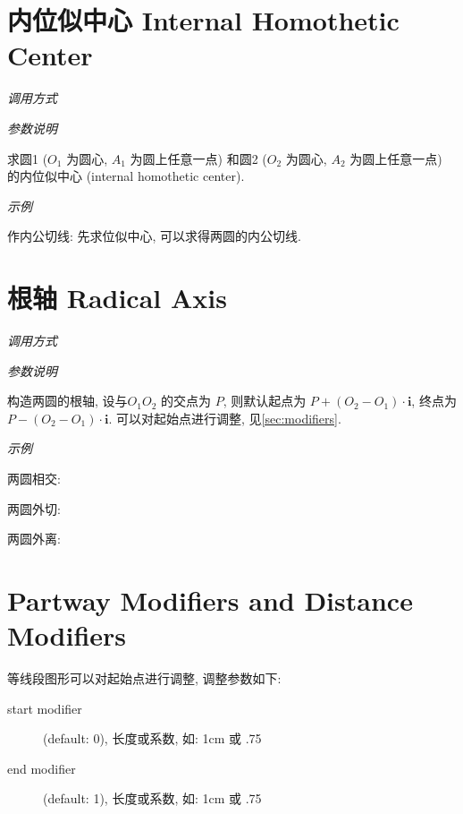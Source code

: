 \section{内位似中心 Internal Homothetic Center}

\emph{调用方式}

\begin{tcolorbox}{}
\end{tcolorbox}

\emph{参数说明}

求圆1 ($O_1$ 为圆心, $A_1$ 为圆上任意一点)
和圆2 ($O_2$ 为圆心, $A_2$ 为圆上任意一点) 
的内位似中心 (internal homothetic center)\cite{HOMO}.

\emph{示例}

作内公切线: 先求位似中心, 可以求得两圆的内公切线.


\section{根轴 Radical Axis}

\emph{调用方式}

\begin{tcolorbox}{}
\end{tcolorbox}

\emph{参数说明}

构造两圆的根轴, 设与$O_1O_2$ 的交点为 $P$, 则默认起点为 $P+(O_2-O_1) \cdot \mathbf{i}$, 终点为 $P-(O_2-O_1) \cdot \mathbf{i}$.
可以对起始点进行调整, 见\ref{sec:modifiers}.

\emph{示例}

两圆相交:


两圆外切:


两圆外离:


\section{Partway Modifiers and Distance Modifiers}%

等线段图形可以对起始点进行调整, 调整参数如下\cite{CALC}:

\begin{description}
  \item[start modifier] (default: 0), 长度或系数, 如: 1cm 或 .75
  \item[end modifier] (default: 1), 长度或系数, 如: 1cm 或 .75
\end{description}
